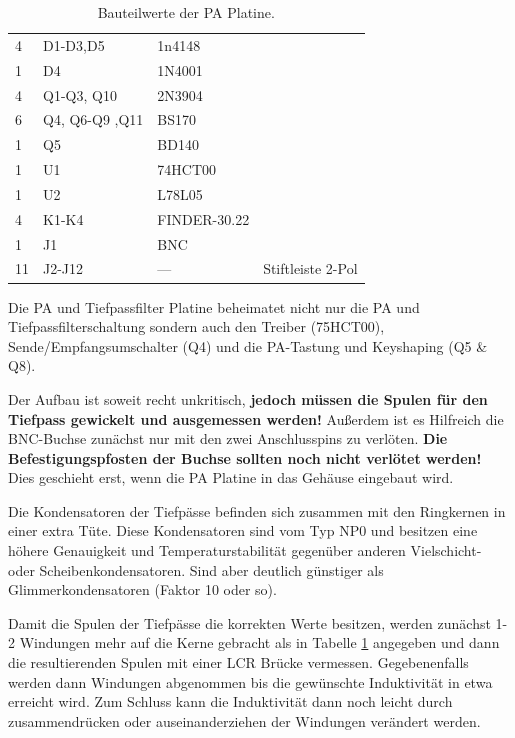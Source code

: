 \documentclass[10pt, a4paper]{paper}
\newcommand{\warn}[1]{\textbf{#1}}
\begin{document}
\begin{table}[!ht]
\begin{tabular}{|p{1cm}|p{6cm}|p{2cm}|p{3cm}|}
 4  & D1-D3,D5 & 1n4148 & \\
 1  & D4 & 1N4001 & \\

 4  & Q1-Q3, Q10 & 2N3904 & \\
 6  & Q4, Q6-Q9 ,Q11 & BS170 & \\
 1  & Q5 & BD140 & \\

 1  & U1 & 74HCT00 & \\
 1  & U2 & L78L05 & \\

 4  & K1-K4 & FINDER-30.22 & \\

 1  & J1 & BNC & \\

 11 & J2-J12 & --- & Stiftleiste 2-Pol \\ \hline
 \end{tabular}
 \caption{Bauteilwerte der PA Platine.} \label{tab:pa}
\end{table}

Die PA und Tiefpassfilter Platine beheimatet nicht nur die PA und Tiefpassfilterschaltung sondern auch den Treiber (75HCT00), Sende/Empfangsumschalter (Q4) und die PA-Tastung und Keyshaping (Q5 \& Q8).

Der Aufbau ist soweit recht unkritisch, \warn{jedoch müssen die Spulen für den Tiefpass gewickelt und ausgemessen werden!} Außerdem ist es Hilfreich die BNC-Buchse zunächst nur mit den zwei Anschlusspins zu verlöten. \warn{Die Befestigungspfosten der Buchse sollten noch nicht verlötet werden!} Dies geschieht erst, wenn die PA Platine in das Gehäuse eingebaut wird. 

Die Kondensatoren der Tiefpässe befinden sich zusammen mit den Ringkernen in einer extra Tüte. Diese Kondensatoren sind vom Typ NP0 und besitzen eine höhere Genauigkeit und Temperaturstabilität gegenüber anderen Vielschicht- oder Scheibenkondensatoren. Sind aber deutlich günstiger als Glimmerkondensatoren (Faktor 10 oder so).

Damit die Spulen der Tiefpässe die korrekten Werte besitzen, werden zunächst 1-2 Windungen mehr auf die Kerne gebracht als in Tabelle \ref{tab:pa} angegeben und dann die resultierenden Spulen mit einer LCR Brücke vermessen. Gegebenenfalls werden dann Windungen abgenommen bis die gewünschte Induktivität in etwa erreicht wird. Zum Schluss kann die Induktivität dann noch leicht durch zusammendrücken oder auseinanderziehen der Windungen verändert werden. 
\end{document}
